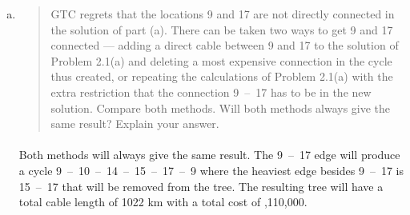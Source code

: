 \begin{enumerate}[(a)]
\begin{figure}[H]
	\centering
	\begin{multicols}{5}
(1,~2), (1,~3), (3,~4), (4,~10), (5,~6), (5,~8), (6,~7), (8,~9), (9,~10), (10,~14), (11,~12), (11,~13), (12,~25), (13,~21), (14,~15), (14,~21), (15,~17), (16,~17), (18,~19), (19,~32), (20,~24), (21,~22), (22,~23), (22,~24), (23,~26), (24,~30), (26,~27), (27,~28), (28,~40), (29,~39), (30,~31), (31,~32), (31,~34), (32,~33), (34,~35), (34,~37), (36,~37), (36,~38), (36,~48), (38,~46), (38,~47), (39,~40), (39,~45), (40,~41), (41,~42), (43,~44), (44,~45), (48,~49), (49,~50)
	\end{multicols}
	\caption{List of connections in a minimum cost communication system}
	\label{mst2-1-a}
\end{figure}

\item \begin{quote}GTC regrets that the locations 9 and 17 are not directly connected in the solution
of part (a). There can be taken two ways to get 9 and 17 connected --- adding
a direct cable between 9 and 17 to the solution of Problem 2.1(a) and deleting a
most expensive connection in the cycle thus created, or repeating the calculations
of Problem 2.1(a) with the extra restriction that the connection 9~--~17 has to be
in the new solution. Compare both methods. Will both methods always give the
same result? Explain your answer.\end{quote}

	\paragraph{}
	Both methods will always give the same result. The 9~--~17 edge will produce a cycle 9~--~10~--~14~--~15~--~17~--~9 where the heaviest edge besides 9~--~17 is 15~--~17 that will be removed from the tree. The resulting tree will have a total cable length of 1022 km with a total cost of ,110,000.


\end{enumerate}
